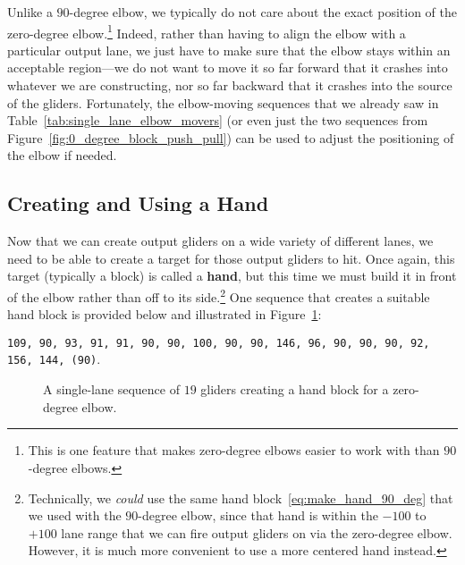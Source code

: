 Unlike a $90$-degree elbow, we typically do not care about the exact position of the zero-degree elbow.\footnote{This is one feature that makes zero-degree elbows easier to work with than $90$-degree elbows.} Indeed, rather than having to align the elbow with a particular output lane, we just have to make sure that the elbow stays within an acceptable region---we do not want to move it so far forward that it crashes into whatever we are constructing, nor so far backward that it crashes into the source of the gliders. Fortunately, the elbow-moving sequences that we already saw in Table~\ref{tab:single_lane_elbow_movers} (or even just the two sequences from Figure~\ref{fig:0_degree_block_push_pull}) can be used to adjust the positioning of the elbow if needed.


\subsection{Creating and Using a Hand}\label{sec:single_channel_zero_make_hand}

Now that we can create output gliders on a wide variety of different lanes, we need to be able to create a target for those output gliders to hit. Once again, this target (typically a block) is called a \textbf{hand}, but this time we must build it in front of the elbow rather than off to its side.\footnote{Technically, we \emph{could} use the same hand block~\eqref{eq:make_hand_90_deg} that we used with the $90$-degree elbow, since that hand is within the $-100$ to $+100$ lane range that we can fire output gliders on via the zero-degree elbow. However, it is much more convenient to use a more centered hand instead.} One sequence that creates a suitable hand block is provided below and illustrated in Figure~\ref{fig:0degree_hand}:
\begin{center}
	\texttt{\small 109, 90, 93, 91, 91, 90, 90, 100, 90, 90, 146, 96, 90, 90, 90, 92, 156, 144, {\color{gray}(90)}}.
\end{center}

\begin{figure}[!htb]
	\centering
	\caption{A single-lane sequence of $19$ gliders creating a hand block for a zero-degree elbow.}\label{fig:0degree_hand}
\end{figure}

